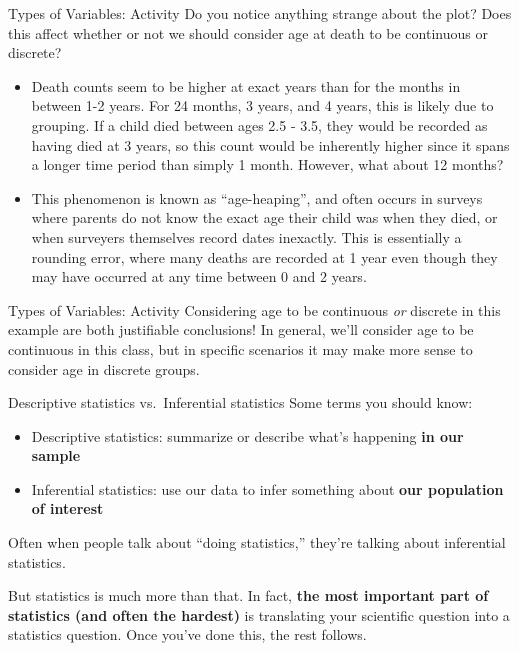 \documentclass[
  ignorenonframetext,
]{beamer}
\providecommand{\tightlist}{%
  \setlength{\itemsep}{0pt}\setlength{\parskip}{0pt}}
\begin{document}
\begin{frame}{Types of Variables: Activity}
\protect\hypertarget{types-of-variables-activity-4}{}
Do you notice anything strange about the plot? Does this affect whether
or not we should consider age at death to be continuous or discrete?

\begin{itemize}
\item
  {Death} counts seem to be higher at exact years than for the months in
  between 1-2 years. For 24 months, 3 years, and 4 years, this is likely
  due to grouping. If a child died between ages 2.5 - 3.5, they would be
  recorded as having died at 3 years, so this count would be inherently
  higher since it spans a longer time period than simply 1 month.
  However, what about 12 months?
\item
  {This phenomenon is known as ``age-heaping''}, and often occurs in
  surveys where parents do not know the exact age their child was when
  they died, or when surveyers themselves record dates inexactly. This
  is essentially a rounding error, where many deaths are recorded at 1
  year even though they may have occurred at any time between 0 and 2
  years.
\end{itemize}
\end{frame}

\begin{frame}{Types of Variables: Activity}
\protect\hypertarget{types-of-variables-activity-5}{}
Considering age to be continuous \emph{or} discrete in this example are
both justifiable conclusions! In general, we'll consider age to be
continuous in this class, but in specific scenarios it may make more
sense to consider age in discrete groups.
\end{frame}

\begin{frame}{Descriptive statistics vs.~Inferential statistics}
\protect\hypertarget{descriptive-statistics-vs.-inferential-statistics}{}
Some terms you should know:

\begin{itemize}
\tightlist
\item
  {Descriptive statistics}: summarize or {describe} what's happening
  {\textbf{in our sample}}\\
\item
  {Inferential statistics}: use our data to {infer} something about
  {\textbf{our population of interest}}
\end{itemize}

Often when people talk about ``doing statistics,'' they're talking about
inferential statistics.

But statistics is much more than that. In fact, \textbf{the most
important part of statistics (and often the hardest) }is translating
your scientific question into a statistics question. Once you've done
this, the rest follows.
\end{frame}
\end{document}
